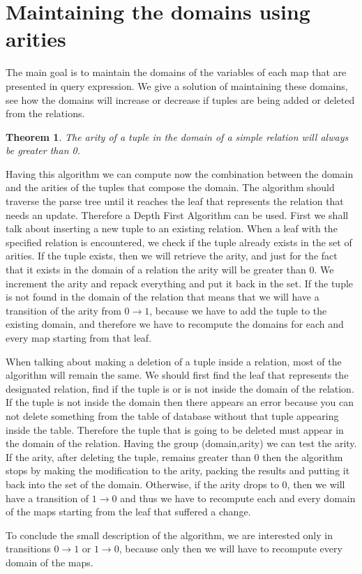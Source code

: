 \documentclass[12pt]{article}
\newtheorem{theorem}{Theorem}[section]
\begin{document}
\section{Maintaining the domains using arities}

The main goal is to maintain the domains of the variables of each map that are presented in query expression. We give a solution of maintaining these domains, see how the domains will increase or decrease if tuples are being added or deleted from the relations.

\begin{theorem}
The arity of a tuple in the domain of a simple relation will always be greater than 0.
\end{theorem}

Having this algorithm we can compute now the combination between the domain and the arities of the tuples that compose the domain. The algorithm should traverse the parse tree until it reaches the leaf that represents the relation that needs an update. Therefore a Depth First Algorithm can be used. First we shall talk about inserting a new tuple to an existing relation. When a leaf with the specified relation is encountered, we check if the tuple already exists in the set of arities. If the tuple exists, then we will retrieve the arity, and just for the fact that it exists in the domain of a relation the arity will be greater than 0. We increment the arity and repack everything and put it back in the set. If the tuple is not found in the domain of the relation that means that we will have a transition of the arity from $0 \rightarrow 1$, because we have to add the tuple to the existing domain, and therefore we have to recompute the domains for each and every map starting from that leaf.\\\par
When talking about making a deletion of a tuple inside a relation, most of the algorithm will remain the same. We should first find the leaf that represents the designated relation, find if the tuple is or is not inside the domain of the relation. If the tuple is not inside the domain then there appears an error because you can not delete something from the table of database without that tuple appearing inside the table. Therefore the tuple that is going to be deleted must appear in the domain of the relation. Having the group (domain,arity) we can test the arity. If the arity, after deleting the tuple, remains greater than 0 then the algorithm stops by making the modification to the arity, packing the results and putting it back into the set of the domain. Otherwise, if the arity drops to 0, then we will have a transition of $1 \rightarrow 0$ and thus we have to recompute each and every domain of the maps starting from the leaf that suffered a change.\\\par
To conclude the small description of the algorithm, we are interested only in transitions $0 \rightarrow 1$ or $1 \rightarrow 0$, because only then we will have to recompute every domain of the maps.
\end{document}
